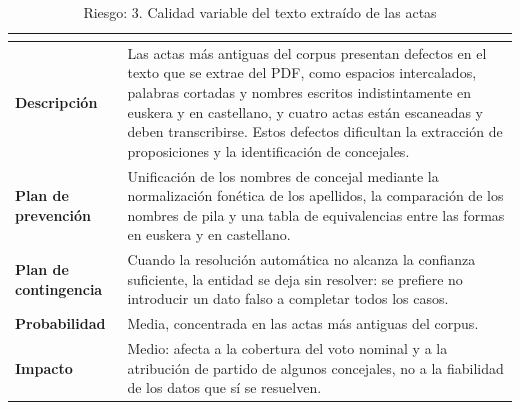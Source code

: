 \documentclass[11pt, a4paper]{report}
\begin{document}
	\begin{table}[H]
		\centering
		\begin{tabularx}{\linewidth}{|>{\bfseries}l|X|}
			\hline
			\rowcolor{riesgo-header}
			\multicolumn{2}{|c|}{\textcolor{white}{\textbf{3. Calidad variable del texto extraído de las actas}}} \\
			\hline
			Descripción & Las actas más antiguas del corpus presentan defectos en el texto que se extrae del PDF, como espacios intercalados, palabras cortadas y nombres escritos indistintamente en euskera y en castellano, y cuatro actas están escaneadas y deben transcribirse. Estos defectos dificultan la extracción de proposiciones y la identificación de concejales. \\
			\hline
			\rowcolor{fila-alterna}
			Plan de prevención & Unificación de los nombres de concejal mediante la normalización fonética de los apellidos, la comparación de los nombres de pila y una tabla de equivalencias entre las formas en euskera y en castellano. \\
			\hline
			Plan de contingencia & Cuando la resolución automática no alcanza la confianza suficiente, la entidad se deja sin resolver: se prefiere no introducir un dato falso a completar todos los casos. \\
			\hline
			\rowcolor{fila-alterna}
			Probabilidad & Media, concentrada en las actas más antiguas del corpus. \\
			\hline
			Impacto & Medio: afecta a la cobertura del voto nominal y a la
			atribución de partido de algunos concejales, no a la fiabilidad de
			los datos que sí se resuelven. \\
			\hline
		\end{tabularx}
		\caption{Riesgo: 3. Calidad variable del texto extraído de las actas}
		\label{tab:riesgo-ocr}
	\end{table}
\end{document}
